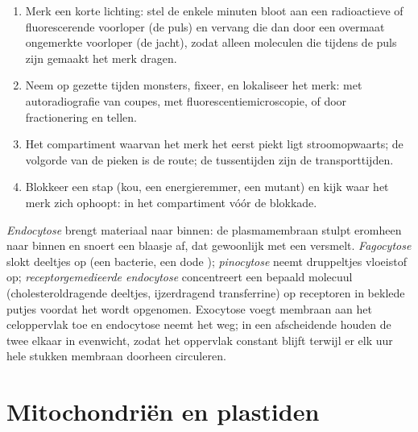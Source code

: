 \begin{method}\label{met:b1:eukaryotic-cell:pulsechase}
\begin{enumerate}
  \item Merk een korte lichting: stel de  enkele minuten bloot aan
        een radioactieve of fluorescerende voorloper (de puls) en vervang
        die dan door een overmaat ongemerkte voorloper (de jacht), zodat
        alleen moleculen die tijdens de puls zijn gemaakt het merk dragen.
  \item Neem op gezette tijden monsters, fixeer, en lokaliseer het merk:
        met autoradiografie van coupes, met fluorescentiemicroscopie, of
        door fractionering en tellen.
  \item Het compartiment waarvan het merk het eerst piekt ligt
        stroomopwaarts; de volgorde van de pieken is de route; de tussen\-tijden
        zijn de transporttijden.
  \item Blokkeer een stap (kou, een energieremmer, een mutant) en kijk waar
        het merk zich ophoopt: in het compartiment vóór de blokkade.
\end{enumerate}
\end{method}

\begin{definition}[Endocytose]\label{def:b1:eukaryotic-cell:endocytosis}
\emph{Endocytose} brengt materiaal naar binnen: de
plasmamembraan stulpt eromheen naar binnen en snoert een blaasje af, dat
gewoonlijk met een  versmelt. \emph{Fagocytose} slokt deeltjes op (een
bacterie, een dode ); \emph{pinocytose} neemt druppeltjes vloeistof op;
\emph{receptorgemedieerde endocytose} concentreert een bepaald molecuul
(cholesteroldragende deeltjes, ijzerdragend transferrine) op receptoren in
beklede putjes voordat het wordt opgenomen. Exocytose voegt membraan aan het
celoppervlak toe en endocytose neemt het weg; in een afscheidende  houden de
twee elkaar in evenwicht, zodat het oppervlak constant blijft terwijl er elk uur
hele stukken membraan doorheen circuleren.
\end{definition}

\section{Mitochondriën en plastiden}

